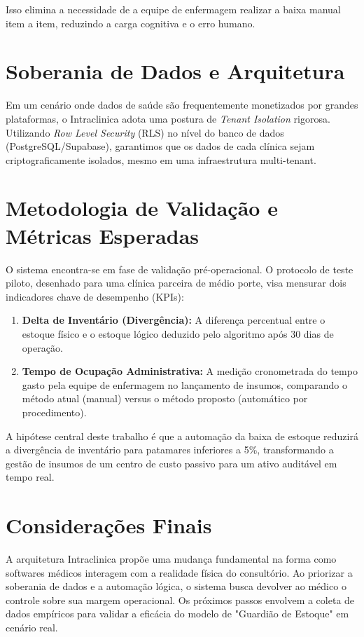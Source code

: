 \documentclass[12pt, openright, twoside, a4paper, english, french, spanish]{abntex2}
\begin{document}
Isso elimina a necessidade de a equipe de enfermagem realizar a baixa manual item a item, reduzindo a carga cognitiva e o erro humano.

\section{Soberania de Dados e Arquitetura}

Em um cenário onde dados de saúde são frequentemente monetizados por grandes plataformas, o Intraclinica adota uma postura de \textit{Tenant Isolation} rigorosa. Utilizando \textit{Row Level Security} (RLS) no nível do banco de dados (PostgreSQL/Supabase), garantimos que os dados de cada clínica sejam criptograficamente isolados, mesmo em uma infraestrutura multi-tenant.

\section{Metodologia de Validação e Métricas Esperadas}

O sistema encontra-se em fase de validação pré-operacional. O protocolo de teste piloto, desenhado para uma clínica parceira de médio porte, visa mensurar dois indicadores chave de desempenho (KPIs):

\begin{enumerate}
    \item \textbf{Delta de Inventário (Divergência):} A diferença percentual entre o estoque físico e o estoque lógico deduzido pelo algoritmo após 30 dias de operação.
    \item \textbf{Tempo de Ocupação Administrativa:} A medição cronometrada do tempo gasto pela equipe de enfermagem no lançamento de insumos, comparando o método atual (manual) versus o método proposto (automático por procedimento).
\end{enumerate}

A hipótese central deste trabalho é que a automação da baixa de estoque reduzirá a divergência de inventário para patamares inferiores a 5\%, transformando a gestão de insumos de um centro de custo passivo para um ativo auditável em tempo real.

\section*{Considerações Finais}

A arquitetura Intraclinica propõe uma mudança fundamental na forma como softwares médicos interagem com a realidade física do consultório. Ao priorizar a soberania de dados e a automação lógica, o sistema busca devolver ao médico o controle sobre sua margem operacional. Os próximos passos envolvem a coleta de dados empíricos para validar a eficácia do modelo de "Guardião de Estoque" em cenário real.
\end{document}
